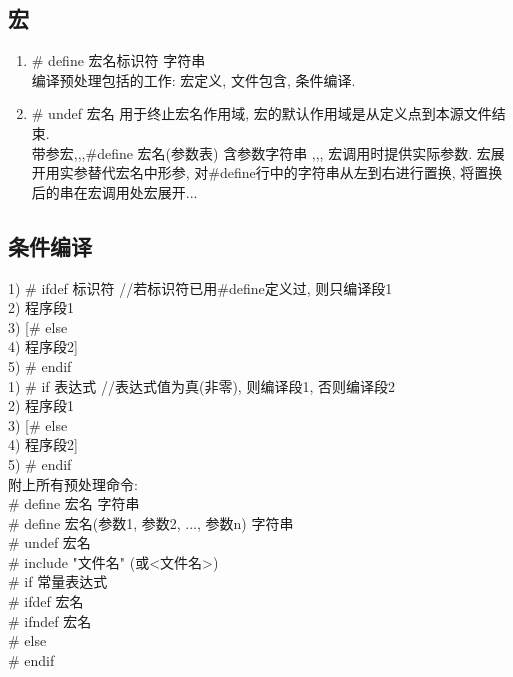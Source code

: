 \documentclass[a4paper,10pt,english]{article}
\begin{document}
\subsection {宏}
\begin{enumerate}
\item{\# define 宏名标识符 字符串} \\
编译预处理包括的工作: 宏定义, 文件包含, 条件编译. 

\item{\# undef 宏名  用于终止宏名作用域, 宏的默认作用域是从定义点到本源文件结束.}\\
带参宏,,,\#define 宏名(参数表) 含参数字符串 ,,, 宏调用时提供实际参数. 宏展开用实参替代宏名中形参, 对\#define行中的字符串从左到右进行置换, 将置换后的串在宏调用处宏展开...
\end{enumerate}

\subsection{条件编译}
1)\hspace{0em} \# ifdef 标识符    //若标识符已用\#define定义过, 则只编译段1 \\
2)\hspace{3em} 程序段1 \\
3)\hspace{0em} [\# else\\
4)\hspace{3em} 程序段2] \\
5)\hspace{0em} \# endif
\\

1)\hspace{0em} \# if 表达式                     //表达式值为真(非零), 则编译段1, 否则编译段2 \\
2)\hspace{3em} 程序段1\\
3)\hspace{0em} [\# else\\
4)\hspace{3em} 程序段2]\\
5)\hspace{0em} \# endif \\
附上所有预处理命令:\\
\# define 宏名 字符串 \\
\# define 宏名(参数1, 参数2, ..., 参数n) 字符串 \\
\# undef 宏名 \\
\# include "文件名" (或<文件名>) \\
\# if 常量表达式 \\
\# ifdef 宏名 \\
\# ifndef 宏名 \\
\# else \\
\# endif \\
\end{document}
